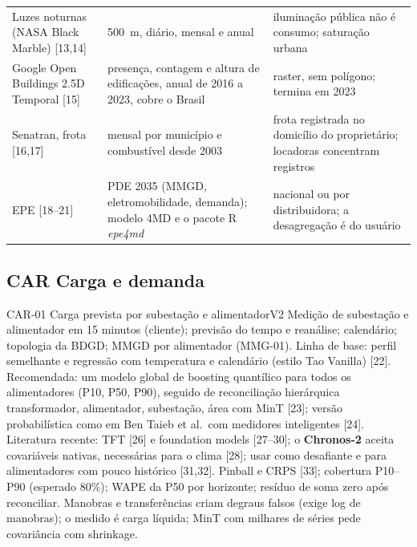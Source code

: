 \begin{table}[H]
\begin{tabularx}{\textwidth}{P{3.2cm} L P{4.2cm}}
Luzes noturnas (NASA Black Marble) [13,14] & 500~m, diário, mensal e anual & iluminação pública não é consumo; saturação urbana \\
Google Open Buildings 2.5D Temporal [15] & presença, contagem e altura de edificações, anual de 2016 a 2023, cobre o Brasil & raster, sem polígono; termina em 2023 \\
Senatran, frota [16,17] & mensal por município e combustível desde 2003 & frota registrada no domicílio do proprietário; locadoras concentram registros \\
EPE [18--21] & PDE 2035 (MMGD, eletromobilidade, demanda); modelo 4MD e o pacote R \emph{epe4md} & nacional ou por distribuidora; a desagregação é do usuário \\
\bottomrule
\end{tabularx}
\end{table}

\subsection{CAR \textperiodcentered{} Carga e demanda}

\begin{ficha}{CAR-01 \textperiodcentered{} Carga prevista por subestação e alimentador}{V2}
 Medição de subestação e alimentador em 15 minutos (cliente);
previsão do tempo e reanálise; calendário; topologia da BDGD; MMGD por
alimentador (MMG-01).
 Linha de base: perfil semelhante e regressão com
temperatura e calendário (estilo Tao Vanilla) [22]. Recomendada: um modelo
global de boosting quantílico para todos os alimentadores (P10, P50, P90),
seguido de reconciliação hierárquica transformador, alimentador,
subestação, área com MinT [23]; versão probabilística como em Ben Taieb et
al.\ com medidores inteligentes [24]. Literatura recente: TFT [26] e foundation
models [27--30]; o \textbf{Chronos-2} aceita covariáveis nativas,
necessárias para o clima [28]; usar como desafiante e para alimentadores com
pouco histórico [31,32].
 Pinball e CRPS [33]; cobertura P10--P90 (esperado 80\%);
WAPE da P50 por horizonte; resíduo de soma zero após reconciliar.
 Manobras e transferências criam degraus falsos (exige
log de manobras); o medido é carga líquida; MinT com milhares de séries pede
covariância com shrinkage.
\end{ficha}

